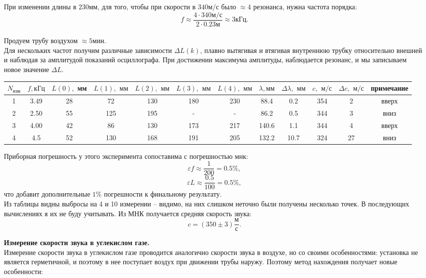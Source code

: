 \documentclass[12pt,a4paper]{article}
\begin{document}
При изменении длины в $230 \text{мм}$, для того, чтобы при скорости в $340\text{м}/\text{с}$ было $\approx 4$ резонанса, нужна частота порядка:
$$f \approx \frac{4\cdot340\text{м}/\text{с}}{2 \cdot 0.23 \text{м}} \approx 3\text{кГц}.$$\\
Продуем трубу воздухом $\approx 5 \text{мин}$.\\
Для нескольких частот получим различные зависимости $\Delta L(k)$, плавно вытягивая и втягивая внутреннюю трубку относительно внешней и наблюдая за амплитудой показаний осциллографа. При достижении максимума амплитуды, наблюдается резонанс, и мы записываем новое значение $\Delta L$.

\begin{center}
\begin{tabular}{|c|c|c|c|c|c|c|c|c|c|c|c|}
\hline $N_\text{изм}$&$f, \text{кГц}$&$L(0),$ мм&$L(1),$ $\text{мм}$&$L(2),$ $\text{мм}$&$L(3),$ $\text{мм}$&$L(4),$ $\text{мм}$&$\lambda, \text{мм}$&$\Delta \lambda,$ $\text{мм}$&$c,$ $\text{м}/\text{с}$&$\Delta c,$ $\text{м}/\text{с}$&примечание\\ \hline
1&3.49&28&72&130&180&230&88.4&0.2&354&2&вверх\\ \hline
2&2.50&55&125&195&-&-&86.2&0.5&344&3&вниз\\ \hline
3&4.00&42&86&130&173&217&140.6&1.1&344&4&вверх\\ \hline
4&4.5&52&130&168&191&205&132.2&10.7&324&27&вниз\\ \hline
\end{tabular}
\end{center}


Приборная погрешность у этого эксперимента сопоставима с погрешностью мнк:
$$\varepsilon f \approx \frac{1}{200} = 0.5\%,$$
$$\varepsilon L \approx \frac{0.5}{100} = 0.5\%,$$
что добавит дополнительные $1\%$ погрешности к финальному результату.\\
Из таблицы видны выбросы на 4 и 10 измерении -- видимо, на них слишком неточно были получены несколько точек. В последующих вычислениях я их не буду учитывать.
Из МНК получается средняя скорость звука:
$$c = (350\pm3)\frac{\text{м}}{\text{с}}.$$

\textbf{Измерение скорости звука в углекислом газе.}\\
Измерение скорости звука в углекислом газе проводится аналогично скорости звука в воздухе, но со своими особенностями: установка не является герметичной, и поэтому в нее поступает воздух при движении трубы наружу. Поэтому метод нахождения получает новые особенности:
\end{document}
